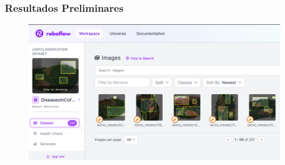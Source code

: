 \documentclass[aspectratio=169]{beamer}
\begin{document}
\begin{frame}
    \frametitle{Resultados Preliminares}


    \begin{figure}
        \centering
        \includegraphics[scale = 0.3]{img/roboflow.png}
        \label{fig:entelabel}
    \end{figure}




\end{frame}




\end{document}
